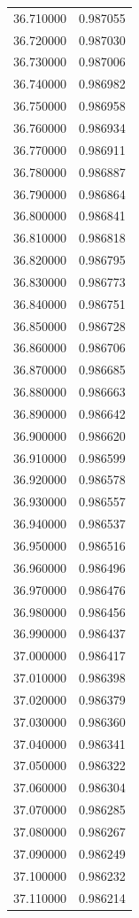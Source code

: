 \begin{tabular}{rr}
36.710000 & 0.987055 \\
36.720000 & 0.987030 \\
36.730000 & 0.987006 \\
36.740000 & 0.986982 \\
36.750000 & 0.986958 \\
36.760000 & 0.986934 \\
36.770000 & 0.986911 \\
36.780000 & 0.986887 \\
36.790000 & 0.986864 \\
36.800000 & 0.986841 \\
36.810000 & 0.986818 \\
36.820000 & 0.986795 \\
36.830000 & 0.986773 \\
36.840000 & 0.986751 \\
36.850000 & 0.986728 \\
36.860000 & 0.986706 \\
36.870000 & 0.986685 \\
36.880000 & 0.986663 \\
36.890000 & 0.986642 \\
36.900000 & 0.986620 \\
36.910000 & 0.986599 \\
36.920000 & 0.986578 \\
36.930000 & 0.986557 \\
36.940000 & 0.986537 \\
36.950000 & 0.986516 \\
36.960000 & 0.986496 \\
36.970000 & 0.986476 \\
36.980000 & 0.986456 \\
36.990000 & 0.986437 \\
37.000000 & 0.986417 \\
37.010000 & 0.986398 \\
37.020000 & 0.986379 \\
37.030000 & 0.986360 \\
37.040000 & 0.986341 \\
37.050000 & 0.986322 \\
37.060000 & 0.986304 \\
37.070000 & 0.986285 \\
37.080000 & 0.986267 \\
37.090000 & 0.986249 \\
37.100000 & 0.986232 \\
37.110000 & 0.986214 \\

\end{tabular}
